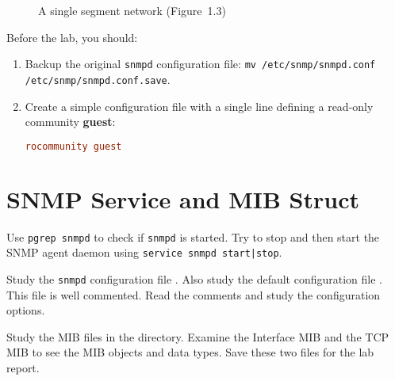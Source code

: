 \documentclass{../UTNetLab}
\begin{document}
\begin{center}
\begin{minipage}{0.48\textwidth}
\begin{flushright}
\begin{figure}[H]
                    \caption{A single segment network (Figure~1.3)}\label{fig:1.3}
                \end{figure}
            \end{flushright}
        \end{minipage}
    \end{center}

    Before the lab, you should:
    \begin{enumerate}
        \item Backup the original \lstinline{snmpd} configuration file:
        \lstinline{mv /etc/snmp/snmpd.conf /etc/snmp/snmpd.conf.save}.
        \item Create a simple configuration file  with a single line defining a read-only community \textbf{guest}:
        \begin{lstlisting}[language={conf}, emph={guest}]
rocommunity guest
        \end{lstlisting}
    \end{enumerate}

\section{SNMP Service and MIB Struct}
    Use \lstinline{pgrep snmpd} to check if \lstinline{snmpd} is started.
    Try to stop and then start the SNMP agent daemon using \lstinline{service snmpd start|stop}.

    Study the \lstinline{snmpd} configuration file .
    Also study the default configuration file .
    This file is well commented.
    Read the comments and study the configuration options.

    Study the MIB files in the  directory.
    Examine the Interface MIB  and the TCP MIB  to see the MIB objects and data types.
    Save these two files for the lab report.
\end{document}
